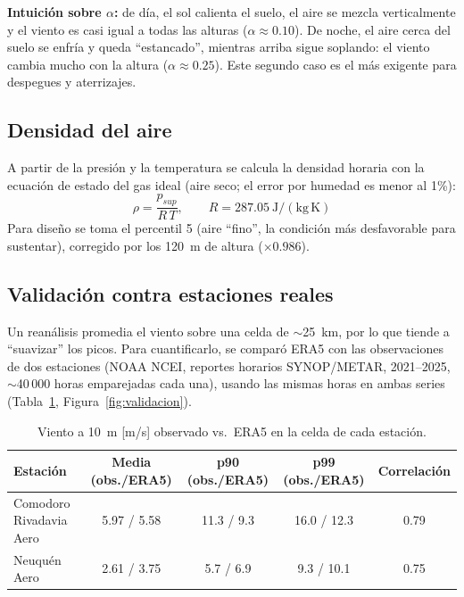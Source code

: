 \documentclass[11pt]{article}
\begin{document}
\textbf{Intuición sobre $\alpha$:} de día, el sol calienta el suelo, el aire
se mezcla verticalmente y el viento es casi igual a todas las alturas
($\alpha\approx0.10$). De noche, el aire cerca del suelo se enfría y queda
``estancado'', mientras arriba sigue soplando: el viento cambia mucho con la
altura ($\alpha\approx0.25$). Este segundo caso es el más exigente para
despegues y aterrizajes.

\subsection{Densidad del aire}

A partir de la presión y la temperatura se calcula la densidad horaria con
la ecuación de estado del gas ideal (aire seco; el error por humedad es
menor al 1\%):
\begin{equation}
\rho = \frac{p_{sup}}{R\,T}, \qquad R = 287.05~\mathrm{J/(kg\,K)}
\end{equation}
Para diseño se toma el percentil 5 (aire ``fino'', la condición más
desfavorable para sustentar), corregido por los 120~m de altura
($\times0.986$).

\subsection{Validación contra estaciones reales}
\label{sec:validacion}

Un reanálisis promedia el viento sobre una celda de $\sim$25~km, por lo que
tiende a ``suavizar'' los picos. Para cuantificarlo, se comparó ERA5 con las
observaciones de dos estaciones (NOAA NCEI, reportes horarios SYNOP/METAR,
2021--2025, $\sim$40\,000 horas emparejadas cada una), usando las mismas
horas en ambas series (Tabla~\ref{tab:validacion},
Figura~\ref{fig:validacion}).

\begin{table}[H]
\centering
\small
\begin{tabular}{@{}lcccc@{}}
\toprule
Estación & Media (obs./ERA5) & p90 (obs./ERA5) & p99 (obs./ERA5) & Correlación \\
\midrule
Comodoro Rivadavia Aero & 5.97 / 5.58 & 11.3 / 9.3 & 16.0 / 12.3 & 0.79 \\
Neuquén Aero & 2.61 / 3.75 & 5.7 / 6.9 & 9.3 / 10.1 & 0.75 \\
\bottomrule
\end{tabular}
\caption{Viento a 10~m [m/s] observado vs.\ ERA5 en la celda de cada estación.}
\label{tab:validacion}
\end{table}
\end{document}
